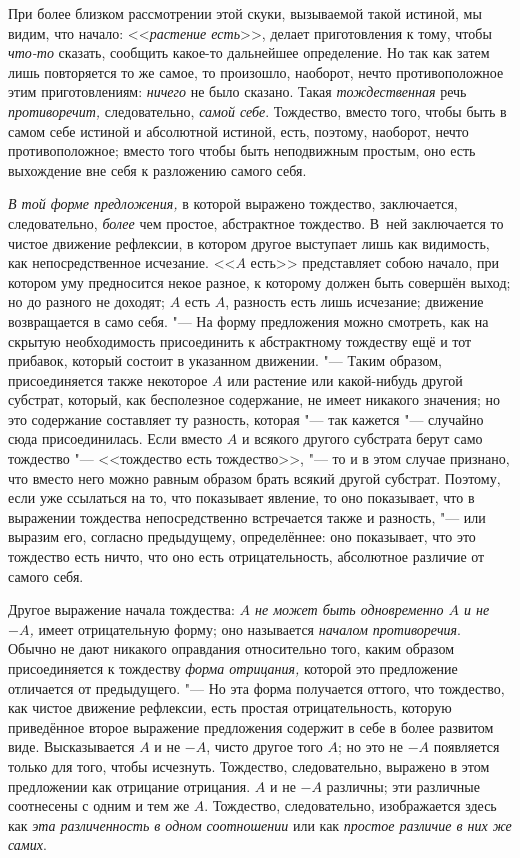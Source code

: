 При более близком рассмотрении этой скуки, вызываемой такой истиной, мы
видим, что начало: <<{\em растение есть}>>, делает
приготовления к тому, чтобы {\em что-то} сказать,
сообщить какое-то дальнейшее определение. Но так как затем лишь повторяется
то же самое, то произошло, наоборот, нечто противоположное этим
приготовлениям: {\em ничего} не было сказано. Такая
{\em тождественная} речь {\em противоречит,} следовательно,
{\em самой себе}. Тождество, вместо того, чтобы быть в
самом себе истиной и абсолютной истиной, есть, поэтому, наоборот, нечто
противоположное; вместо того чтобы быть неподвижным простым, оно есть
выхождение вне себя к разложению самого себя.

{\em В той форме предложения,} в которой выражено
тождество, заключается, следовательно, {\em более} чем
простое, абстрактное тождество. В~ней заключается то чистое движение
рефлексии, в котором другое выступает лишь как видимость, как
непосредственное исчезание. <<$A$ есть>> представляет собою начало,
при котором уму предносится некое разное, к которому должен быть совершён
выход; но до разного не доходят; $A$ есть $A$, разность есть
лишь исчезание; движение возвращается в само себя. "--- На форму предложения
можно смотреть, как на скрытую необходимость присоединить к абстрактному
тождеству ещё и тот прибавок, который состоит в указанном движении. "--- Таким
образом, присоединяется также некоторое $A$ или растение или
какой-нибудь другой субстрат, который, как бесполезное содержание, не имеет
никакого значения; но это содержание составляет ту разность, которая "--- так
кажется "--- случайно сюда присоединилась. Если вместо $A$ и всякого другого
субстрата берут само тождество "--- <<тождество есть тождество>>, "--- то и
в этом случае признано, что вместо него можно равным образом брать всякий
другой субстрат. Поэтому, если уже ссылаться на то, что показывает явление,
то оно показывает, что в выражении тождества непосредственно встречается
также и разность, "--- или выразим его, согласно предыдущему, определённее:
оно показывает, что это тождество есть ничто, что оно есть отрицательность,
абсолютное различие от самого себя.

Другое выражение начала тождества: {\em $A$ не может быть
одновременно $A$ и не $-A$,} имеет отрицательную форму; оно называется
{\em началом противоречия}. Обычно не дают никакого
оправдания относительно того, каким образом присоединяется к тождеству
{\em форма отрицания,} которой это предложение
отличается от предыдущего. "--- Но эта форма получается оттого, что тождество,
как чистое движение рефлексии, есть простая отрицательность, которую
приведённое второе выражение предложения содержит в себе в более развитом
виде. Высказывается $A$ и не $-A$, чисто другое того
$A$; но это не $-A$ появляется только для того, чтобы
исчезнуть. Тождество, следовательно, выражено в этом предложении как
отрицание отрицания. $A$ и не $-A$ различны; эти различные
соотнесены с одним и тем же $A$. Тождество, следовательно,
изображается здесь как {\em эта различенность в одном
соотношении} или как {\em простое различие в них же
самих}.

